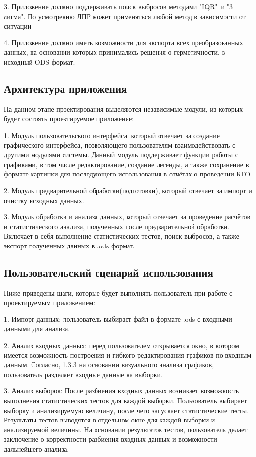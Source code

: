 3. Приложение должно поддерживать поиск выбросов методами "IQR"\ и "3 cигма". По усмотрению ЛПР может применяться любой метод в зависимости от ситуации.

4. Приложение должно иметь возможности для экспорта всех преобразованных
данных, на основании которых принимались решения о герметичности, в
исходный ODS формат.

\subsection{Архитектура приложения}

На данном этапе проектирования выделяются независимые модули, из которых будет состоять проектируемое приложение:

1. Модуль пользовательского интерфейса, который отвечает за создание
графического интерфейса, позволяющего пользователям взаимодействовать с другими модулями системы. Данный модуль поддерживает функции работы с графиками, в том числе редактирование, создание легенды, а также сохранение в формате картинки для последующего использования в отчётах о проведении КГО.

2. Модуль предварительной обработки(подготовки), который
отвечает за импорт и очистку исходных данных.

3. Модуль обработки и анализа данных, который отвечает за проведение
расчётов и статистического анализа, полученных после предварительной
обработки. Включает в себя выполнение статистических тестов, поиск выбросов, а также экспорт полученных данных в .ods формат.

\subsection{Пользовательский сценарий использования} \label{Scenarii}

Ниже приведены шаги, которые будет выполнять пользователь при работе с проектируемым приложением:

1. Импорт данных: пользователь выбирает файл в формате .ods с входными данными для анализа.

2. Анализ входных данных: перед пользователем открывается окно, в котором имеется возможность построения и гибкого редактирования графиков по входным данным. Согласно, 1.3.3 на основании визуального анализа графиков, пользователь разделяет входные данные на выборки.

3. Анализ выборок: После разбиения входных данных возникает возможность выполнения статистических тестов для каждой выборки. Пользователь выбирает выборку и анализируемую величину, после чего запускает статистические тесты. Результаты тестов выводятся в отдельном окне для каждой выборки и анализируемой величины. На основании результатов тестов, пользователь делает заключение о корректности разбиения входных данных и возможности дальнейшего анализа.

